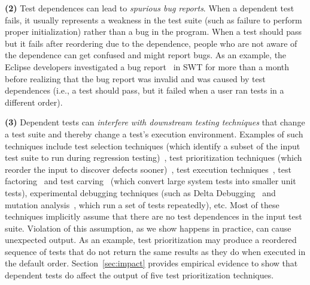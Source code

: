 \textbf{(2)}
Test dependences can lead to \emph{spurious bug reports}.
When a dependent test fails, it usually represents
a weakness in the test
suite (such as failure to perform proper initialization) rather than a bug
in the program. 
When a test should pass but
it fails after reordering due to the dependence,
people who are not aware of the dependence can get confused
and might report bugs.
%
As an example, the Eclipse developers
investigated a bug report~\cite{eclipsebug} in SWT for
more than a month before realizing that the 
bug report was invalid and was caused by test dependences
(i.e., a test should pass, but it failed when a user
ran tests in a different order).
%



\textbf{(3)}
Dependent tests can \textit{interfere with downstream testing
techniques} that change a test suite and thereby change a test's execution environment.
Examples of such techniques include
test selection techniques (which identify a subset of
the input test suite to run during
regression testing)~\cite{harroldetal:OOPSLA:2001, Orso:2004:SRT,
Briand:2009:ART, Zhang:2012:RMT, Nanda:2011:RTP, hsu09may},
test prioritization techniques (which reorder the
input to discover defects sooner)~\cite{Elbaum:2000:PTC:347324.348910, Kim:2002:HTP:581339.581357, Rummel:2005:TPR:1066677.1067016, Srivastava:2002:EPT:566172.566187, Jiang:2009:ART},
test execution techniques~\cite{Kim:2013:OUT},
test factoring~\cite{Saff:2005, Wu:2010:LRV} and test carving~\cite{Elbaum:2006} (which
convert large system tests into smaller unit tests),
experimental debugging techniques (such as Delta
Debugging~\cite{Zeller:2002, Steimann:2013, Zhang:2013:IMF} and mutation
analysis~\cite{Zhang:2012:RMT, Schuler:2009:EMT, Zhang:2013:FMT},
which run a set of tests repeatedly), etc. 
Most of these techniques implicitly assume that
there are no test dependences in the input test suite. Violation of
this assumption, as we show happens in practice, can cause unexpected
output. %
As an example, test prioritization may produce a reordered sequence
of tests that do not
return the same results as they do when executed in
the default order. Section~\ref{sec:impact}
provides empirical evidence to show that
dependent tests do affect the output of five test prioritization
techniques.


